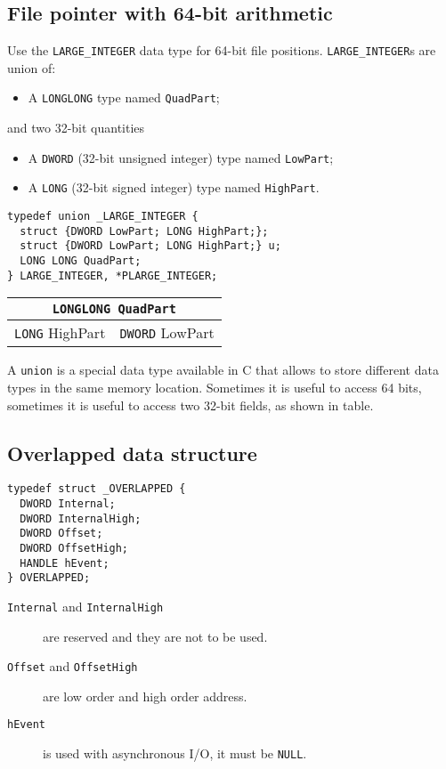 \subsection{File pointer with 64-bit arithmetic}
Use the \texttt{LARGE\_INTEGER} data type for 64-bit file positions. \texttt{LARGE\_INTEGER}s are union of:
\begin{itemize}
\item A \texttt{LONGLONG} type named \texttt{QuadPart};
\end{itemize}
and two 32-bit quantities
\begin{itemize}
\item A \texttt{DWORD} (32-bit unsigned integer) type named \texttt{LowPart};
\item A \texttt{LONG} (32-bit signed integer) type named \texttt{HighPart}.
\end{itemize}

\begin{verbatim}
typedef union _LARGE_INTEGER {
  struct {DWORD LowPart; LONG HighPart;};
  struct {DWORD LowPart; LONG HighPart;} u;
  LONG LONG QuadPart;
} LARGE_INTEGER, *PLARGE_INTEGER;
\end{verbatim}

\begin{center}
\begin{tabular}{|c|c|}
\hline 
\multicolumn{2}{|c|}{\texttt{LONGLONG QuadPart}} \\ 
\hline 
\texttt{LONG} HighPart & \texttt{DWORD} LowPart \\ 
\hline 
\end{tabular}
\end{center}

A \texttt{union} is a special data type available in C that allows to store different data types in the same memory location. Sometimes it is useful to access 64 bits, sometimes it is useful to access two 32-bit fields, as shown in table.

\subsection{Overlapped data structure}
\begin{verbatim}
typedef struct _OVERLAPPED {
  DWORD Internal;
  DWORD InternalHigh;
  DWORD Offset;
  DWORD OffsetHigh;
  HANDLE hEvent;
} OVERLAPPED;
\end{verbatim}

\begin{description}
\item [\texttt{Internal} and \texttt{InternalHigh}] are reserved and they are not to be used.
\item [\texttt{Offset} and \texttt{OffsetHigh}] are low order and high order address.
\item [\texttt{hEvent}] is used with asynchronous I/O, it must be \texttt{NULL}.
\end{description}

